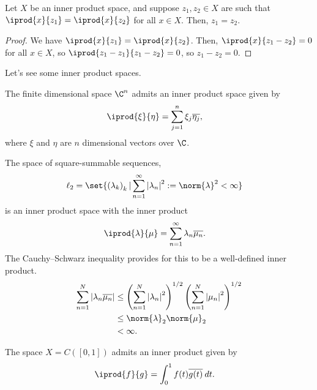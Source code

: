 \documentclass[10pt]{mypackage}
\begin{document}
\begin{fact}
  Let $X$ be an inner product space, and suppose $z_1,z_2\in X$ are such that $ \iprod{x}{z_1} = \iprod{x}{z_2} $ for all $x\in X$. Then, $z_1 = z_2$.
\end{fact}
\begin{proof}
  We have $ \iprod{x}{z_1} = \iprod{x}{z_2} $. Then, $ \iprod{x}{z_1 - z_2} = 0 $ for all $x\in X$, so $ \iprod{z_1 - z_1}{z_1 - z_2} = 0 $, so $z_1 - z_2 = 0$.
\end{proof}
Let's see some inner product spaces.
\begin{example}
  The finite dimensional space $\C^n$ admits an inner product space given by
  \begin{align*}
    \iprod{\xi}{\eta} &= \sum_{j=1}^{n}\xi_j \overline{\eta_j},
  \end{align*}
  where $\xi$ and $\eta$ are $n$ dimensional vectors over $\C$.
\end{example}
\begin{example}
  The space of square-summable sequences,
  \begin{align*}
    \ell_2 &= \set{\left(\lambda_k\right)_k | \sum_{n=1}^{\infty}\left\vert \lambda_n \right\vert^2 := \norm{\lambda}^2 < \infty}
  \end{align*}
  is an inner product space with the inner product
  \begin{align*}
    \iprod{\lambda}{\mu} &= \sum_{n=1}^{\infty}\lambda_n \overline{\mu_n}.
  \end{align*}
  The Cauchy--Schwarz inequality provides for this to be a well-defined inner product.
  \begin{align*}
    \sum_{n=1}^{N}\left\vert \lambda_n \overline{\mu_n} \right\vert &\leq \left(\sum_{n=1}^{N}\left\vert \lambda_n \right\vert^2\right)^{1/2}\left(\sum_{n=1}^{N}\left\vert \mu_n \right\vert^2\right)^{1/2}\\
                                                                    &\leq \norm{\lambda}_2\norm{\mu}_2\\
                                                                    &< \infty.
  \end{align*}
\end{example}
\begin{example}
  The space $X = C\left([0,1]\right)$ admits an inner product given by
  \begin{align*}
    \iprod{f}{g} &= \int_{0}^{1} f(t)\overline{g(t)}\:dt.
  \end{align*}
\end{example}
\end{document}
